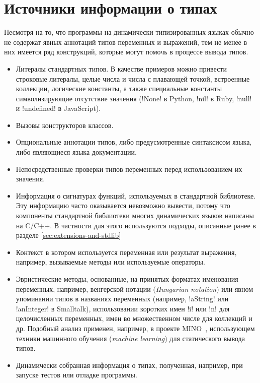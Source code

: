 \section{Источники информации о типах}
\label{sec:type-sources}

Несмотря на то, что программы на динамически типизированных языках обычно не
содержат явных аннотаций типов переменных и выражений, тем не менее в них
имеется ряд конструкций, которые могут помочь в процессе вывода типов. 

\begin{itemize}
    \item{%
        Литералы стандартных типов. В качестве примеров можно привести
        строковые литералы, целые числа и числа с плавающей точкой, встроенные
        коллекции, логические константы, а также специальные константы символизирующие
        отсутствие значения (!None! в Python, !nil! в Ruby,
        !null! и !undefined! в JavaScript).
      }
    \item{%
        Вызовы конструкторов классов.
      }
    \item{%
        Опциональные аннотации типов, либо предусмотренные синтаксисом языка, либо
        являющиеся языка документации.
      }
    \item{%
        Непосредственные проверки типов переменных перед использованием их
        значения.
      }
    \item{%
        Информация о сигнатурах функций, используемых в стандартной
        библиотеке. Эту информацию часто оказывается невозможно вывести, потому
        что компоненты стандартной библиотеки многих
        динамических языков написаны на C/C++. В частности для этого
        используются подходы, описанные ранее в разделе
        \ref{sec:extensions-and-stdlib}
      }
    \item{%
        Контекст в котором используется переменная или результат выражения, 
        например, вызываемые методы или используемые операторы.
      }
    \item{%
        Эвристические методы, основанные, на принятых форматах
        именования переменных, например, венгерской нотации (\emph{Hungarian
          notation}) или явном упоминании типов в названиях переменных (например,
        !aString! или !anInteger! в Smalltalk), использовании коротких имен !i! или !n!
        для целочисленных переменных, имен во множественном числе для коллекций
        и др. Подобный анализ применен, например, в проекте MINO~\cite[]{Tu},
        использующем техники машинного обучения (\emph{machine learning}) для
        статического вывода типов.
    }
    \item{%
      Динамически собранная информация о типах, полученная, например, при
      запуске тестов или отладке программы.
    }
\end{itemize}
     
